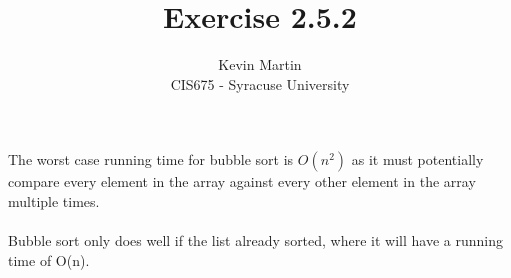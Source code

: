 \documentclass{article}
\author{Kevin Martin\\ CIS675 - Syracuse University}
\title{Exercise 2.5.2}
\begin{document}
\maketitle
The worst case running time for bubble sort is \(O(n^2)\) as it must potentially compare every element in the array 
against every other element in the array multiple times. \\\\
Bubble sort only does well if the list already sorted, where it will have a running time of O(n).
\end{document}
